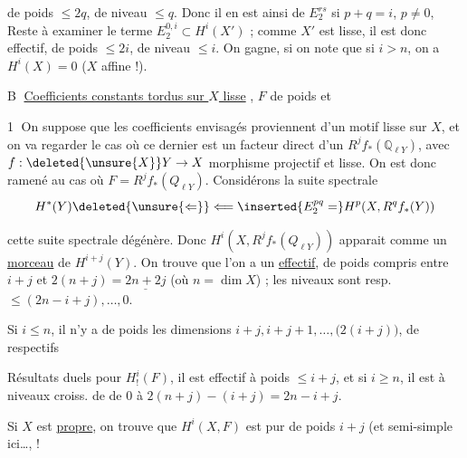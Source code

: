 de  poids $\le 2q$, de niveau $\le q$. Donc il en est ainsi de $E^{rs}_2$ si $p+q=i$, $p\ne 0$,  Reste à examiner le terme $E^{0,i}_2\subset H^i(X')$ ; comme $X'$ est lisse, il est donc effectif, de poids $\le 2i$, de niveau $\le i$. On gagne\unsure{!}, si on note que si $i>n$, on a $H^i(X)=0$ ($X$ affine !).


\textcircled{B} \uline{Coefficients constants tordus sur $X$ lisse} , $F$  de poids et 

\textcircled{1} On suppose que les coefficients envisagés proviennent d'un motif lisse sur $X$, et  on va regarder le cas où ce dernier est un facteur direct d'un $R^jf_*(\mathbb Q_{\ell Y})$, avec $f:\deleted{\unsure{X}}Y\to X$ morphisme projectif et lisse.  On est donc ramené au cas où $F=R^jf_*(Q_{\ell Y})$.  Considérons la suite spectrale
\[
 H^*(Y)\deleted{\unsure{\Leftarrow}}\Longleftarrow \inserted{E^{pq}_2=}H^p(X,R^q f_*(Y))
\]

 cette suite spectrale dégénère. Donc $H^i(X,R^jf_*(Q_{\ell Y}))$  apparait comme un \uline{morceau} de $H^{i+j}(Y)$. On trouve que l'on a un  \uline{effectif}, de poids \deleted{\unsure{\#}} compris entre   \uline{$i+j$} et $2(n+j)=\underline{2n+2j}$ (où $n=\dim X$) ; les niveaux sont resp. $\le(2n-i+j),\ldots,0$.

Si $i\le n$, il n'y a de poids  les dimensions $i+j,i+j+1,\ldots,\bigl(2(i+j)\bigr)$, de   respectifs  

Résultats duels pour $H^i_!(F)$, il est effectif à poids $\le i+j$, et  si $i\ge n$, il est à niveaux croiss. de de $0$ à  $2(n+j)-(i+j)=2n-i+j$. 

Si $X$ est \uline{propre}, on trouve que $H^i(X,F)$ est pur de poids $i+j$ (et semi-simple ici\ldots, !
